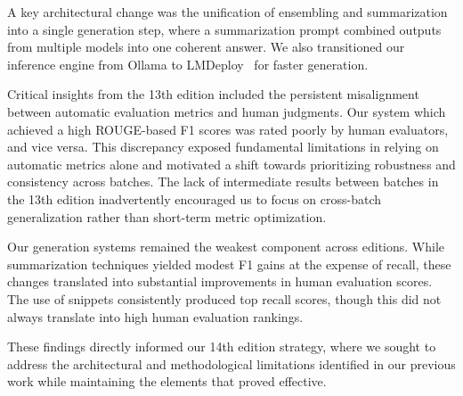A key architectural change was the unification of ensembling and summarization into a single generation step, where a summarization prompt combined outputs from multiple models into one coherent answer. We also transitioned our inference engine from Ollama to LMDeploy~\cite{lmdeploy2023} for faster generation.

Critical insights from the 13th edition included the persistent misalignment between automatic evaluation metrics and human judgments. Our system which achieved a high ROUGE-based F1 scores was rated poorly by human evaluators, and vice versa. This discrepancy exposed fundamental limitations in relying on automatic metrics alone and motivated a shift towards prioritizing robustness and consistency across batches. The lack of intermediate results between batches in the 13th edition inadvertently encouraged us to focus on cross-batch generalization rather than short-term metric optimization.

Our generation systems remained the weakest component across editions. While summarization techniques yielded modest F1 gains at the expense of recall, these changes translated into substantial improvements in human evaluation scores. The use of snippets consistently produced top recall scores, though this did not always translate into high human evaluation rankings.

These findings directly informed our 14th edition strategy, where we sought to address the architectural and methodological limitations identified in our previous work while maintaining the elements that proved effective.
